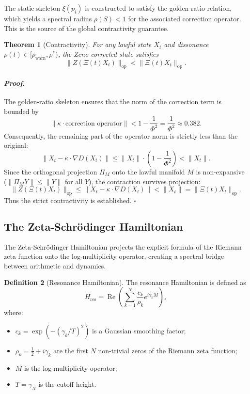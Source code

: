 \documentclass[12pt]{article}
\theoremstyle{plain}
\newtheorem{theorem}{Theorem}[section]
\theoremstyle{definition}
\newtheorem{definition}[theorem]{Definition}
\theoremstyle{remark}
\renewenvironment{proof}{\paragraph{\textit{Proof}.}}{\hfill$\square$}
\begin{document}
The static skeleton $\xi(p_i)$ is constructed to satisfy the golden-ratio relation, which yields a spectral radius $\rho(S) < 1$ for the associated correction operator. This is the source of the global contractivity guarantee.

\begin{theorem}[Contractivity]
For any lawful state $X_t$ and dissonance $\rho(t) \in [\rho_{\text{warn}}, \rho^*)$, the Zeno-corrected state satisfies
\[
\|Z(\Xi(t)X_t)\|_{\text{op}} < \|\Xi(t)X_t\|_{\text{op}}.
\]
\end{theorem}

\begin{proof}
The golden-ratio skeleton ensures that the norm of the correction term is bounded by
\[
\|\kappa \cdot \text{correction operator}\| < 1 - \frac{1}{\Phi^2} = \frac{1}{\Phi^2} \approx 0.382.
\]
Consequently, the remaining part of the operator norm is strictly less than the original:
\[
\|X_t - \kappa\cdot\nabla D(X_t)\| \leq \|X_t\| \cdot \left(1 - \frac{1}{\Phi^2}\right) < \|X_t\|.
\]
Since the orthogonal projection $\Pi_M$ onto the lawful manifold $M$ is non-expansive ($\|\Pi_M Y\| \leq \|Y\|$ for all $Y$), the contraction survives projection:
\[
\|Z(\Xi(t)X_t)\|_{\text{op}} \leq \|X_t - \kappa\cdot\nabla D(X_t)\| < \|X_t\| = \|\Xi(t)X_t\|_{\text{op}}.
\]
Thus the strict contractivity is established.
\end{proof}

\subsection{The Zeta-Schrödinger Hamiltonian}

The Zeta-Schrödinger Hamiltonian projects the explicit formula of the Riemann zeta function onto the log-multiplicity operator, creating a spectral bridge between arithmetic and dynamics.

\begin{definition}[Resonance Hamiltonian]
The resonance Hamiltonian is defined as
\[
H_{\text{res}} = \operatorname{Re}\!\left( \sum_{k=1}^N \frac{c_k}{\rho_k} e^{i\gamma_k M} \right),
\]
where:
\begin{itemize}
    \item $c_k = \exp\!\left( -(\gamma_k / T)^2 \right)$ is a Gaussian smoothing factor;
    \item $\rho_k = \frac{1}{2} + i\gamma_k$ are the first $N$ non-trivial zeros of the Riemann zeta function;
    \item $M$ is the log-multiplicity operator;
    \item $T = \gamma_N$ is the cutoff height.
\end{itemize}
\end{definition}
\end{document}
